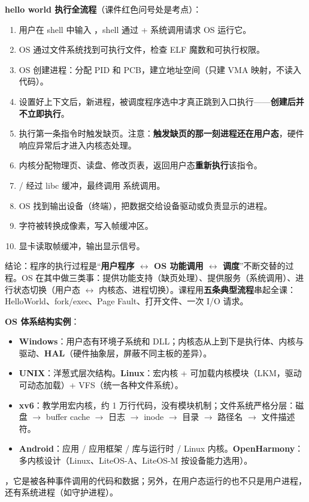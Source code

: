 \textbf{hello world 执行全流程}（课件红色问号处是考点）：
\begin{enumerate}
    \item 用户在 shell 中输入 ，shell 通过  +  系统调用请求 OS 运行它。
    \item OS 通过文件系统找到可执行文件，检查 ELF 魔数和可执行权限。
    \item OS 创建进程：分配 PID 和 PCB，建立地址空间（只建 VMA 映射，不读入代码）。
    \item 设置好上下文后，新进程，被调度程序选中才真正跳到入口执行——\textbf{创建后并不立即执行}。
    \item 执行第一条指令时触发缺页。注意：\textbf{触发缺页的那一刻进程还在用户态}，硬件响应异常后才进入内核态处理。
    \item 内核分配物理页、读盘、修改页表，返回用户态\textbf{重新执行}该指令。
    \item {}/ 经过 libc 缓冲，最终调用  系统调用。
    \item OS 找到输出设备（终端），把数据交给设备驱动或负责显示的进程。
    \item 字符被转换成像素，写入帧缓冲区。
    \item 显卡读取帧缓冲，输出显示信号。
\end{enumerate}
结论：程序的执行过程是“\textbf{用户程序 $\leftrightarrow$ OS 功能调用 $\leftrightarrow$ 调度}”不断交替的过程。OS 在其中做三类事：提供功能支持（缺页处理）、提供服务（系统调用）、进行状态切换（用户态 $\leftrightarrow$ 内核态、进程切换）。课程用\textbf{五条典型流程}串起全课：HelloWorld、fork/exec、Page Fault、打开文件、一次 I/O 请求。

\textbf{OS 体系结构实例}：
\begin{itemize}
    \item \textbf{Windows}：用户态有环境子系统和 DLL；内核态从上到下是执行体、内核与驱动、\textbf{HAL}（硬件抽象层，屏蔽不同主板的差异）。
    \item \textbf{UNIX}：洋葱式层次结构。\textbf{Linux}：宏内核 + 可加载内核模块（LKM，驱动可动态加载）+ VFS（统一各种文件系统）。
    \item \textbf{xv6}：教学用宏内核，约 1 万行代码，没有模块机制；文件系统严格分层：磁盘 $\to$ buffer cache $\to$ 日志 $\to$ inode $\to$ 目录 $\to$ 路径名 $\to$ 文件描述符。
    \item \textbf{Android}：应用 / 应用框架 / 库与运行时 / Linux 内核。\textbf{OpenHarmony}：多内核设计（Linux、LiteOS-A、LiteOS-M 按设备能力选用）。
\end{itemize}
\ez {}，它是被各种事件调用的代码和数据；另外，在用户态运行的也不只是用户进程，还有系统进程（如守护进程）。

